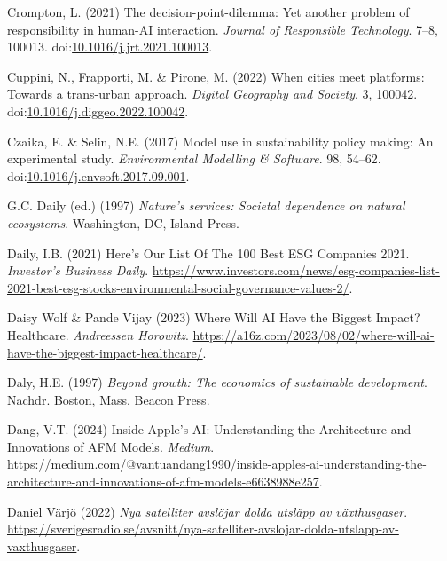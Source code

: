 \documentclass[
  letterpaper,
  DIV=11,
  numbers=noendperiod]{scrartcl}
\newlength{\cslhangindent}
\newenvironment{CSLReferences}[2] %
 {\begin{list}{}{%
  \setlength{\itemindent}{0pt}
  \setlength{\leftmargin}{0pt}
  \setlength{\parsep}{0pt}
  \ifodd #1
   \setlength{\leftmargin}{\cslhangindent}
   \setlength{\itemindent}{-1\cslhangindent}
  \fi
  \setlength{\itemsep}{#2\baselineskip}}}
 {\end{list}}
\begin{document}
\begin{CSLReferences}{0}{1}
Crompton, L. (2021) The decision-point-dilemma: {Yet} another problem of
responsibility in human-{AI} interaction. \emph{Journal of Responsible
Technology}. 7--8, 100013.
doi:\href{https://doi.org/10.1016/j.jrt.2021.100013}{10.1016/j.jrt.2021.100013}.

Cuppini, N., Frapporti, M. \& Pirone, M. (2022) When cities meet
platforms: {Towards} a trans-urban approach. \emph{Digital Geography and
Society}. 3, 100042.
doi:\href{https://doi.org/10.1016/j.diggeo.2022.100042}{10.1016/j.diggeo.2022.100042}.

Czaika, E. \& Selin, N.E. (2017) Model use in sustainability policy
making: {An} experimental study. \emph{Environmental Modelling \&
Software}. 98, 54--62.
doi:\href{https://doi.org/10.1016/j.envsoft.2017.09.001}{10.1016/j.envsoft.2017.09.001}.

G.C. Daily (ed.) (1997) \emph{Nature's services: Societal dependence on
natural ecosystems}. Washington, DC, Island Press.

Daily, I.B. (2021) Here's {Our List Of The} 100 {Best ESG Companies}
2021. \emph{Investor's Business Daily}.
\url{https://www.investors.com/news/esg-companies-list-2021-best-esg-stocks-environmental-social-governance-values-2/}.

Daisy Wolf \& Pande Vijay (2023) Where {Will AI Have} the {Biggest
Impact}? {Healthcare}. \emph{Andreessen Horowitz}.
\url{https://a16z.com/2023/08/02/where-will-ai-have-the-biggest-impact-healthcare/}.

Daly, H.E. (1997) \emph{Beyond growth: The economics of sustainable
development}. Nachdr. Boston, Mass, Beacon Press.

Dang, V.T. (2024) Inside {Apple}'s {AI}: {Understanding} the
{Architecture} and {Innovations} of {AFM Models}. \emph{Medium}.
\url{https://medium.com/@vantuandang1990/inside-apples-ai-understanding-the-architecture-and-innovations-of-afm-models-e6638988e257}.

Daniel Värjö (2022) \emph{{Nya satelliter avsl{ö}jar dolda utsl{ä}pp av
v{ä}xthusgaser}}.
\url{https://sverigesradio.se/avsnitt/nya-satelliter-avslojar-dolda-utslapp-av-vaxthusgaser}.


\end{CSLReferences}
\end{document}
